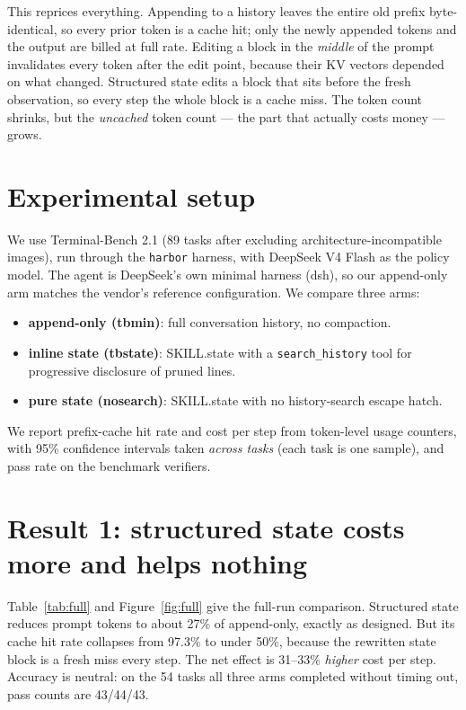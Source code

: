 \documentclass[11pt]{article}
\begin{document}
This reprices everything. Appending to a history leaves the entire old prefix
byte-identical, so every prior token is a cache hit; only the newly appended
tokens and the output are billed at full rate. Editing a block in the
\emph{middle} of the prompt invalidates every token after the edit point,
because their KV vectors depended on what changed. Structured state edits a block
that sits before the fresh observation, so every step the whole block is a cache
miss. The token count shrinks, but the \emph{uncached} token count --- the part
that actually costs money --- grows.

\section{Experimental setup}
We use Terminal-Bench 2.1 (89 tasks after excluding architecture-incompatible
images), run through the \texttt{harbor} harness, with DeepSeek V4 Flash as the
policy model. The agent is DeepSeek's own minimal harness (dsh), so our
append-only arm matches the vendor's reference configuration. We compare three
arms:
\begin{itemize}[leftmargin=*,itemsep=1pt]
\item \textbf{append-only (tbmin)}: full conversation history, no compaction.
\item \textbf{inline state (tbstate)}: SKILL.state with a \texttt{search\_history}
tool for progressive disclosure of pruned lines.
\item \textbf{pure state (nosearch)}: SKILL.state with no history-search escape hatch.
\end{itemize}
We report prefix-cache hit rate and cost per step from token-level usage
counters, with 95\% confidence intervals taken \emph{across tasks} (each task is
one sample), and pass rate on the benchmark verifiers.

\section{Result 1: structured state costs more and helps nothing}
\label{sec:fullrun}
Table~\ref{tab:full} and Figure~\ref{fig:full} give the full-run comparison.
Structured state reduces prompt tokens to about 27\% of append-only, exactly as
designed. But its cache hit rate collapses from 97.3\% to under 50\%, because the
rewritten state block is a fresh miss every step. The net effect is 31--33\%
\emph{higher} cost per step. Accuracy is neutral: on the 54 tasks all three arms
completed without timing out, pass counts are 43/44/43.
\end{document}
